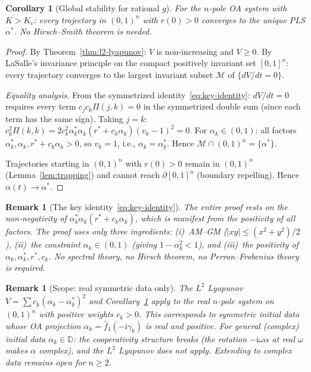 \documentclass[11pt,a4paper]{article}
\newtheorem{corollary}[theorem]{Corollary}
\newtheorem{remark}[theorem]{Remark}
\theoremstyle{definition}
\newcommand{\D}{\mathbb{D}}
\begin{document}
\begin{corollary}[Global stability for rational $g$]\label{cor:rational-stability}
For the $n$-pole OA system with $K > K_c$: every trajectory in $(0,1)^n$ with $r(0) > 0$ converges to the unique PLS $\alpha^*$. No Hirsch--Smith theorem is needed.
\end{corollary}

\begin{proof}
By Theorem~\ref{thm:l2-lyapunov}: $V$ is non-increasing and $V \geq 0$. By LaSalle's invariance principle on the compact positively invariant set $[0,1]^n$: every trajectory converges to the largest invariant subset $\mathcal{M}$ of $\{dV/dt = 0\}$.

\emph{Equality analysis.} From the symmetrized identity~\eqref{eq:key-identity}: $dV/dt = 0$ requires every term $c_j c_k \Pi(j,k) = 0$ in the symmetrized double sum (since each term has the same sign). Taking $j = k$: $c_k^2 \Pi(k,k) = 2c_k^2 \alpha^*_k \alpha_k (r^* + c_k \alpha_k)(v_k - 1)^2 = 0$. For $\alpha_k \in (0,1)$: all factors $\alpha^*_k, \alpha_k, r^* + c_k\alpha_k > 0$, so $v_k = 1$, i.e., $\alpha_k = \alpha^*_k$. Hence $\mathcal{M} \cap (0,1)^n = \{\alpha^*\}$.

Trajectories starting in $(0,1)^n$ with $r(0) > 0$ remain in $(0,1)^n$ (Lemma~\ref{lem:trapping}) and cannot reach $\partial[0,1]^n$ (boundary repelling). Hence $\alpha(t) \to \alpha^*$.
\end{proof}

\begin{remark}[The key identity~\eqref{eq:key-identity}]
The entire proof rests on the non-negativity of $\alpha^*_k\alpha_k(r^* + c_k\alpha_k)$, which is manifest from the positivity of all factors. The proof uses only three ingredients: (i)~AM--GM ($|xy| \leq (x^2+y^2)/2$), (ii)~the constraint $\alpha_k \in (0,1)$ (giving $1-\alpha_k^2 < 1$), and (iii)~the positivity of $\alpha_k, \alpha^*_k, r^*, c_k$. No spectral theory, no Hirsch theorem, no Perron--Frobenius theory is required.
\end{remark}

\begin{remark}[Scope: real symmetric data only]\label{rem:real-scope}
The $L^2$ Lyapunov $V = \sum c_k(\alpha_k - \alpha^*_k)^2$ and Corollary~\ref{cor:rational-stability} apply to the real $n$-pole system on $(0,1)^n$ with positive weights $c_k > 0$. This corresponds to \emph{symmetric initial data} whose OA projection $\alpha_k = \hat{f}_1(-\mathrm{i}\gamma_k)$ is real and positive. For general (complex) initial data $\alpha_k \in \D$: the cooperativity structure breaks (the rotation $-\mathrm{i}\omega\alpha$ at real $\omega$ makes $\alpha$ complex), and the $L^2$ Lyapunov does not apply. Extending to complex data remains open for $n \geq 2$.
\end{remark}
\end{document}
